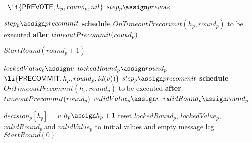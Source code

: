 \begin{algorithm}[htb!]
\begin{algorithmic}[1]
		\ELSE
			\label{line:tab:acceptProposal2}		
			\STATE \Broadcast \ $\li{\Prevote,h_p,round_p,\nil}$  
			\label{line:tab:prevote-nil2}	
		\ENDIF
		\STATE $step_p \assign \prevote$ \label{line:tab:setStateToPrevote3} 	 
		\ENDUPON
		
		\SPACE 
		\color{red}
		\label{line:tab:recvAny2/3Prevote} 
		\STATE $step_p \assign \precommit$
		\STATE \textbf{schedule} $OnTimeoutPrecommit(h_p, round_p)$ to be executed \textbf{after}  $\timeoutPrecommit(round_p)$
		\label{line:tab:timeoutPrevote} 
		\ENDUPON
		
		\SHORTSPACE 
			\STATE $StartRound(round_p + 1)$ \label{line:tab:nextRound-1} 
		\ENDUPON


		\SPACE 
		\color{black}
		\label{line:tab:recvPrevote} 
			\STATE $lockedValue_p \assign v$                \label{line:tab:setLockedValue} 
			\STATE $lockedRound_p \assign round_p$   \label{line:tab:setLockedRound} 
			\STATE \Broadcast \ $\li{\Precommit,h_p,round_p,id(v))}$  
			\label{line:tab:precommit-v}	
			\STATE $step_p \assign \precommit$ \label{line:tab:setStateToCommit} 
			\color{red}\STATE \textbf{schedule} $OnTimeoutPrecommit(h_p, round_p)$ to be executed \textbf{after} $\timeoutPrecommit(round_p)$ 
		\ENDIF 
		\STATE $validValue_p \assign v$ \label{line:tab:setValidRound} 
		\STATE $validRound_p \assign round_p$ \label{line:tab:setValidValue} 
		\ENDUPON
		
		
		
			 
		
		\SPACE 
		\label{line:tab:onDecideRule} 
			 \label{line:tab:validDecisionValue} 
				\STATE $decision_p[h_p] = v$ \label{line:tab:decide} 
				\STATE$h_p \assign h_p + 1$ \label{line:tab:increaseHeight} 
				\STATE reset $lockedRound_p$, $lockedValue_p$, $validRound_p$ and $validValue_p$ to initial values 
				and empty message log 
				\STATE $StartRound(0)$   	
			\ENDIF 
		\ENDUPON
		

\end{algorithmic}
\end{algorithm}
